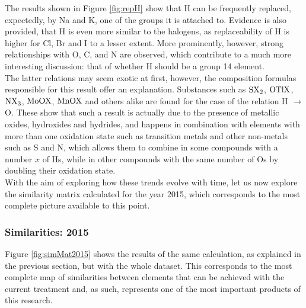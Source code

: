 \documentclass[article]{article}
\begin{document}
The results shown in Figure \ref{fig:repH} show that H can be frequently replaced, expectedly, by Na and K, one of the groups it is attached to. Evidence is also provided, that H is even more similar to the halogens, as replaceability of H is higher for Cl, Br and I to a lesser extent. More prominently, however, strong relationships with O, C, and N are observed, which contribute to a much more interesting discussion: that of whether H should be a group 14 element.\\

The latter relations may seem exotic at first, however, the composition formulas responsible for this result offer an explanation. Substances such as $\ce{SX2}$, $\ce{OTlX}$, $\ce{NX3}$, $\ce{MoOX}$, $\ce{MnOX}$ and others alike are found for the case of the relation H $\rightarrow$ O. These show that such a result is actually due to the presence of metallic oxides, hydroxides and hydrides, and happens in combination with elements with more than one oxidation state such as transition metals and other non-metals such as S and N, which allows them to combine in some compounds with a number $\textit{x}$ of Hs, while in other compounds with the same number of Os by doubling their oxidation state.\\

With the aim of exploring how these trends evolve with time, let us now explore the similarity matrix calculated for the year 2015, which corresponds to the most complete picture available to this point.

\subsubsection{Similarities: 2015}

Figure \ref{fig:simMat2015} shows the results of the same calculation, as explained in the previous section, but with the whole dataset. This corresponds to the most complete map of similarities between elements that can be achieved with the current treatment and, as such, represents one of the most important products of this research. \\
\end{document}
